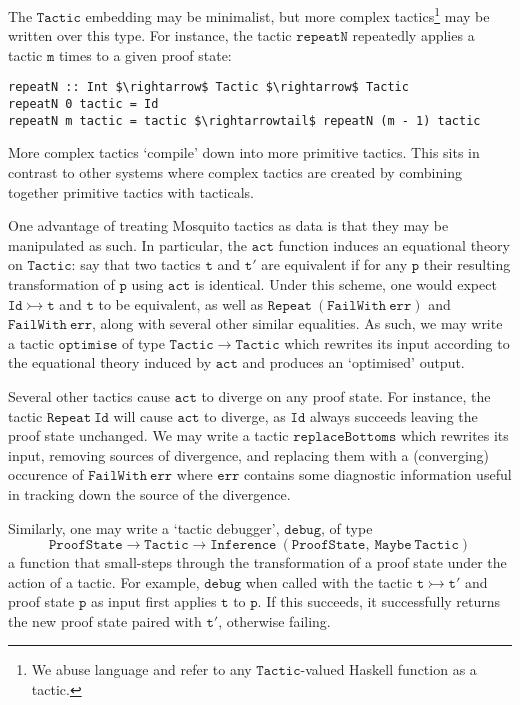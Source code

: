 \documentclass{llncs}
\newcommand{\mosquito}{Mosquito\xspace}
\begin{document}
The $\mathtt{Tactic}$ embedding may be minimalist, but more complex tactics\footnote{We abuse language and refer to any $\mathtt{Tactic}$-valued Haskell function as a tactic.} may be written over this type.
For instance, the tactic $\mathtt{repeatN}$ repeatedly applies a tactic $\mathtt{m}$ times to a given proof state:
\begin{lstlisting}
repeatN :: Int $\rightarrow$ Tactic $\rightarrow$ Tactic
repeatN 0 tactic = Id
repeatN m tactic = tactic $\rightarrowtail$ repeatN (m - 1) tactic
\end{lstlisting}

More complex tactics `compile' down into more primitive tactics.
This sits in contrast to other systems where complex tactics are created by combining together primitive tactics with tacticals.

One advantage of treating \mosquito tactics as data is that they may be manipulated as such.
In particular, the $\mathtt{act}$ function induces an equational theory on $\mathtt{Tactic}$: say that two tactics $\mathtt{t}$ and $\mathtt{t'}$ are equivalent if for any $\mathtt{p}$ their resulting transformation of $\mathtt{p}$ using $\mathtt{act}$ is identical.
Under this scheme, one would expect $\mathtt{Id \rightarrowtail t}$ and $\mathtt{t}$ to be equivalent, as well as $\mathtt{Repeat\ (FailWith\ err)}$ and $\mathtt{FailWith\ err}$, along with several other similar equalities.
As such, we may write a tactic $\mathtt{optimise}$ of type $\mathtt{Tactic \rightarrow Tactic}$ which rewrites its input according to the equational theory induced by $\mathtt{act}$ and produces an `optimised' output.

Several other tactics cause $\mathtt{act}$ to diverge on any proof state.
For instance, the tactic $\mathtt{Repeat\ Id}$ will cause $\mathtt{act}$ to diverge, as $\mathtt{Id}$ always succeeds leaving the proof state unchanged.
We may write a tactic $\mathtt{replaceBottoms}$ which rewrites its input, removing sources of divergence, and replacing them with a (converging) occurence of $\mathtt{FailWith\ err}$ where $\mathtt{err}$ contains some diagnostic information useful in tracking down the source of the divergence.

Similarly, one may write a `tactic debugger', $\mathtt{debug}$, of type
\begin{displaymath}
\mathtt{ProofState \rightarrow Tactic \rightarrow Inference\ (ProofState,\ Maybe\ Tactic)}
\end{displaymath}
a function that small-steps through the transformation of a proof state under the action of a tactic.
For example, $\mathtt{debug}$ when called with the tactic $\mathtt{t \rightarrowtail t'}$ and proof state $\mathtt{p}$ as input first applies $\mathtt{t}$ to $\mathtt{p}$.
If this succeeds, it successfully returns the new proof state paired with $\mathtt{t'}$, otherwise failing.
\end{document}
